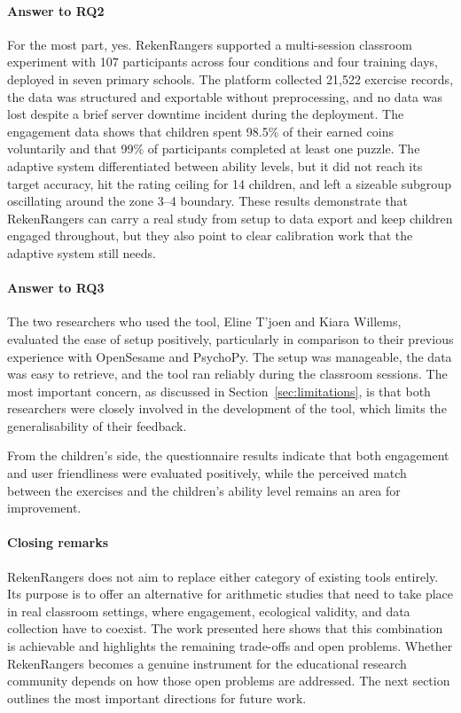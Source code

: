 \paragraph{Answer to RQ2}
For the most part, yes. RekenRangers supported a multi-session classroom experiment with 107 participants across four conditions and four training days, deployed in seven primary schools. The platform collected 21,522 exercise records, the data was structured and exportable without preprocessing, and no data was lost despite a brief server downtime incident during the deployment. The engagement data shows that children spent 98.5\% of their earned coins voluntarily and that 99\% of participants completed at least one puzzle. The adaptive system differentiated between ability levels, but it did not reach its target accuracy, hit the rating ceiling for 14 children, and left a sizeable subgroup oscillating around the zone 3--4 boundary. These results demonstrate that RekenRangers can carry a real study from setup to data export and keep children engaged throughout, but they also point to clear calibration work that the adaptive system still needs.

\paragraph{Answer to RQ3}
The two researchers who used the tool, Eline T'joen and Kiara Willems, evaluated the ease of setup positively, particularly in comparison to their previous experience with OpenSesame and PsychoPy. The setup was manageable, the data was easy to retrieve, and the tool ran reliably during the classroom sessions. The most important concern, as discussed in Section~\ref{sec:limitations}, is that both researchers were closely involved in the development of the tool, which limits the generalisability of their feedback.

From the children's side, the questionnaire results indicate that both engagement and user friendliness were evaluated positively, while the perceived match between the exercises and the children's ability level remains an area for improvement.

\paragraph{Closing remarks}
RekenRangers does not aim to replace either category of existing tools entirely. Its purpose is to offer an alternative for arithmetic studies that need to take place in real classroom settings, where engagement, ecological validity, and data collection have to coexist. The work presented here shows that this combination is achievable and highlights the remaining trade-offs and open problems. Whether RekenRangers becomes a genuine instrument for the educational research community depends on how those open problems are addressed. The next section outlines the most important directions for future work.

